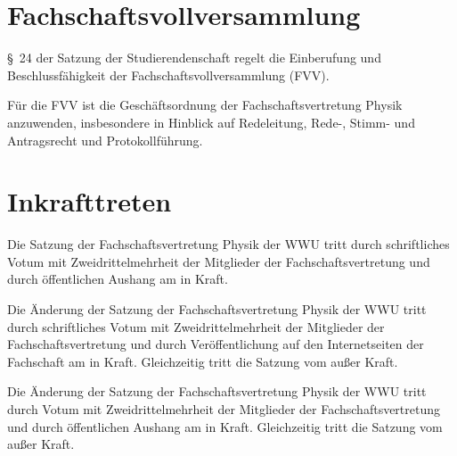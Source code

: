 \documentclass[
a4paper,
12pt,
oneside,
parskip=half-,
pagesize,
headsepline,
german,
ngerman
]{scrartcl}
\begin{document}
	\section{Fachschaftsvollversammlung}
	§~24 der Satzung der Studierendenschaft regelt die Einberufung und Beschlussfähigkeit der Fachschaftsvollversammlung (FVV).
	
	Für die FVV ist die Geschäftsordnung der Fachschaftsvertretung Physik anzuwenden, insbesondere in Hinblick auf Redeleitung, Rede-, Stimm- und Antragsrecht und Protokollführung.
	
	\section{Inkrafttreten}
	Die Satzung der Fachschaftsvertretung Physik der WWU tritt durch schriftliches Votum mit Zweidrittelmehrheit der Mitglieder der Fachschaftsvertretung und durch öffentlichen Aushang am  in Kraft.
	
	Die Änderung der Satzung der Fachschaftsvertretung Physik der WWU tritt durch schriftliches Votum mit Zweidrittelmehrheit der Mitglieder der Fachschaftsvertretung und durch Veröffentlichung auf den Internetseiten der Fachschaft am  in Kraft. Gleichzeitig tritt die Satzung vom  außer Kraft.
	
	Die Änderung der Satzung der Fachschaftsvertretung Physik der WWU tritt durch Votum mit Zweidrittelmehrheit der Mitglieder der Fachschaftsvertretung und durch öffentlichen Aushang am  in Kraft. Gleichzeitig tritt die Satzung vom  außer Kraft.
	
\end{document}
